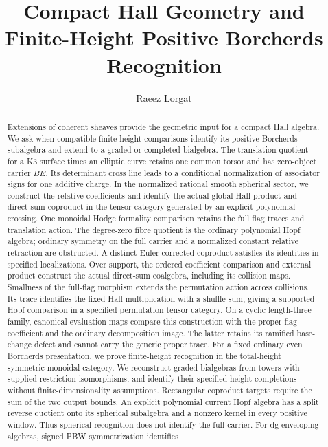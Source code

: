 \documentclass[11pt]{article}
\title{Compact Hall Geometry and\\
Finite-Height Positive Borcherds Recognition}
\author{Raeez Lorgat}
\date{}
\begin{document}
\maketitle

\begin{abstract}
Extensions of coherent sheaves provide the geometric input for a compact
Hall algebra. We ask when compatible finite-height comparisons identify
its positive Borcherds subalgebra and extend to a graded or completed
bialgebra. The translation quotient for a K3 surface times an elliptic
curve retains one common torsor and has zero-object carrier $BE$.
Its determinant cross line leads to a conditional normalization of
associator signs for one additive charge.
In the normalized rational smooth spherical sector, we construct the
relative coefficients and identify the actual global Hall product and
direct-sum coproduct in the tensor category generated by an explicit
polynomial crossing. One monoidal Hodge formality comparison retains
the full flag traces and translation action. The degree-zero fibre
quotient is the ordinary polynomial Hopf algebra; ordinary symmetry on
the full carrier and a normalized constant relative retraction are
obstructed. A distinct Euler-corrected coproduct satisfies its
identities in specified localizations.
Over support, the ordered coefficient comparison and external
product construct the actual direct-sum coalgebra, including its
collision maps. Smallness of the full-flag morphism extends the
permutation action across collisions. Its trace identifies the
fixed Hall multiplication with a shuffle sum, giving a supported
Hopf comparison in a specified permutation tensor category.
On a cyclic length-three family, canonical evaluation maps compare
this construction with the proper flag coefficient and the
ordinary decomposition image. The latter retains its ramified
base-change defect and cannot carry the generic proper trace.
For a fixed ordinary even Borcherds presentation, we prove finite-height
recognition in the total-height symmetric monoidal category.
We reconstruct graded bialgebras from towers with supplied restriction
isomorphisms, and identify their specified height completions without
finite-dimensionality assumptions. Rectangular coproduct targets require
the sum of the two output bounds.
An explicit polynomial current Hopf algebra has a split reverse quotient
onto its spherical subalgebra and a nonzero kernel in every positive
window. Thus spherical recognition does not identify the full carrier.
For dg enveloping algebras, signed PBW symmetrization identifies

\end{abstract}
\end{document}
